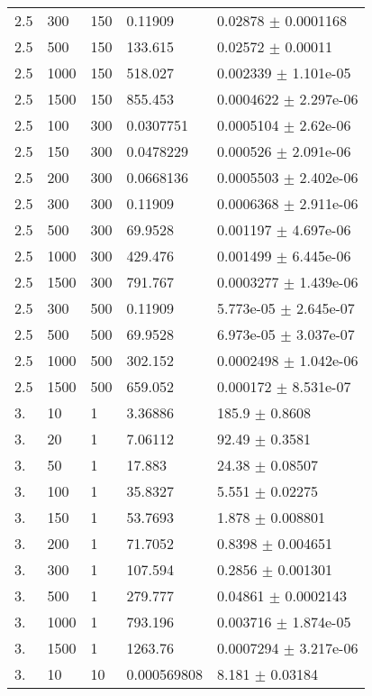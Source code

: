 \begin{longtable}{lllll}
 2.5 &   300 &   150 &  0.11909 &  0.02878 $\pm$ 0.0001168 \\
 2.5 &   500 &   150 &  133.615 &  0.02572 $\pm$  0.00011 \\
 2.5 &  1000 &   150 &  518.027 & 0.002339 $\pm$ 1.101e-05 \\
 2.5 &  1500 &   150 &  855.453 & 0.0004622 $\pm$ 2.297e-06 \\
 2.5 &   100 &   300 & 0.0307751 & 0.0005104 $\pm$ 2.62e-06 \\
 2.5 &   150 &   300 & 0.0478229 & 0.000526 $\pm$ 2.091e-06 \\
 2.5 &   200 &   300 & 0.0668136 & 0.0005503 $\pm$ 2.402e-06 \\
 2.5 &   300 &   300 &  0.11909 & 0.0006368 $\pm$ 2.911e-06 \\
 2.5 &   500 &   300 &  69.9528 & 0.001197 $\pm$ 4.697e-06 \\
 2.5 &  1000 &   300 &  429.476 & 0.001499 $\pm$ 6.445e-06 \\
 2.5 &  1500 &   300 &  791.767 & 0.0003277 $\pm$ 1.439e-06 \\
 2.5 &   300 &   500 &  0.11909 & 5.773e-05 $\pm$ 2.645e-07 \\
 2.5 &   500 &   500 &  69.9528 & 6.973e-05 $\pm$ 3.037e-07 \\
 2.5 &  1000 &   500 &  302.152 & 0.0002498 $\pm$ 1.042e-06 \\
 2.5 &  1500 &   500 &  659.052 & 0.000172 $\pm$ 8.531e-07 \\
  3. &    10 &     1 &  3.36886 &    185.9 $\pm$   0.8608 \\
  3. &    20 &     1 &  7.06112 &    92.49 $\pm$   0.3581 \\
  3. &    50 &     1 &   17.883 &    24.38 $\pm$  0.08507 \\
  3. &   100 &     1 &  35.8327 &    5.551 $\pm$  0.02275 \\
  3. &   150 &     1 &  53.7693 &    1.878 $\pm$ 0.008801 \\
  3. &   200 &     1 &  71.7052 &   0.8398 $\pm$ 0.004651 \\
  3. &   300 &     1 &  107.594 &   0.2856 $\pm$ 0.001301 \\
  3. &   500 &     1 &  279.777 &  0.04861 $\pm$ 0.0002143 \\
  3. &  1000 &     1 &  793.196 & 0.003716 $\pm$ 1.874e-05 \\
  3. &  1500 &     1 &  1263.76 & 0.0007294 $\pm$ 3.217e-06 \\
  3. &    10 &    10 & 0.000569808 &    8.181 $\pm$  0.03184 \\

\end{longtable}
